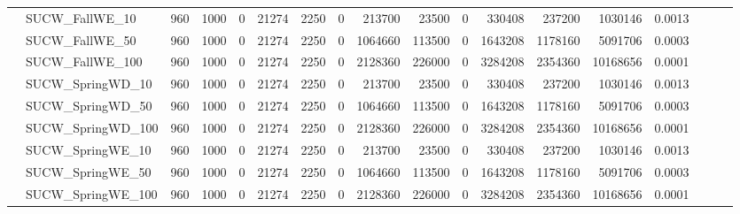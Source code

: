 \begin{table}[h]
{\begin{tabular}{llrrrrrrrrrrrrrlll}
			& SUCW\_FallWE\_10             & 960          & 1000        & 0          & 21274        & 2250        & 0          & 213700  & 23500    & 0      & 330408  & 237200   & 1030146    & 0.0013    &                          &                          &                          \\
			& SUCW\_FallWE\_50             & 960          & 1000        & 0          & 21274        & 2250        & 0          & 1064660 & 113500   & 0      & 1643208 & 1178160  & 5091706    & 0.0003    &                          &                          &                          \\
			& SUCW\_FallWE\_100            & 960          & 1000        & 0          & 21274        & 2250        & 0          & 2128360 & 226000   & 0      & 3284208 & 2354360  & 10168656   & 0.0001    &                          &                          &                          \\
			& SUCW\_SpringWD\_10           & 960          & 1000        & 0          & 21274        & 2250        & 0          & 213700  & 23500    & 0      & 330408  & 237200   & 1030146    & 0.0013    &                          &                          &                          \\
			& SUCW\_SpringWD\_50           & 960          & 1000        & 0          & 21274        & 2250        & 0          & 1064660 & 113500   & 0      & 1643208 & 1178160  & 5091706    & 0.0003    &                          &                          &                          \\
			& SUCW\_SpringWD\_100          & 960          & 1000        & 0          & 21274        & 2250        & 0          & 2128360 & 226000   & 0      & 3284208 & 2354360  & 10168656   & 0.0001    &                          &                          &                          \\
			& SUCW\_SpringWE\_10           & 960          & 1000        & 0          & 21274        & 2250        & 0          & 213700  & 23500    & 0      & 330408  & 237200   & 1030146    & 0.0013    &                          &                          &                          \\
			& SUCW\_SpringWE\_50           & 960          & 1000        & 0          & 21274        & 2250        & 0          & 1064660 & 113500   & 0      & 1643208 & 1178160  & 5091706    & 0.0003    &                          &                          &                          \\
			& SUCW\_SpringWE\_100          & 960          & 1000        & 0          & 21274        & 2250        & 0          & 2128360 & 226000   & 0      & 3284208 & 2354360  & 10168656   & 0.0001    &                          &                          &                          \\

\end{tabular}}
\end{table}

